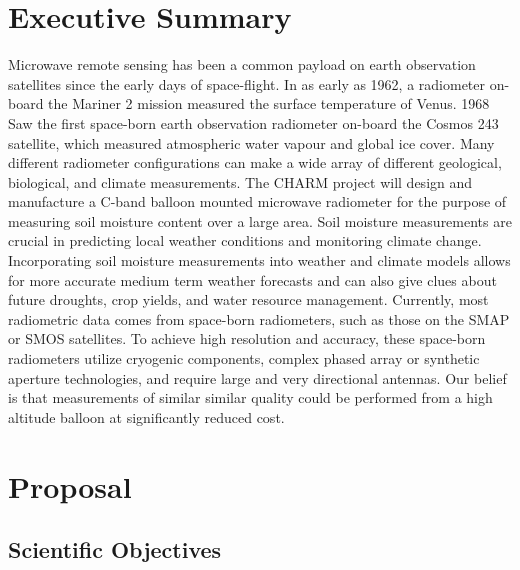 \documentclass[12pt]{article}
\begin{document}
\listoftables
\newpage

\sectionfont{\scshape}


\section{Executive Summary}
Microwave remote sensing has been a common payload on earth observation satellites since the early days of space-flight. In as early as 1962, a radiometer on-board the Mariner 2 mission measured the surface temperature of Venus. 1968 Saw the first space-born earth observation radiometer on-board the  Cosmos 243 satellite, which measured atmospheric water vapour and global ice cover. Many different radiometer configurations can make a wide array of different geological, biological, and climate measurements. The CHARM project will design and manufacture a C-band balloon mounted microwave radiometer for the purpose of measuring soil moisture content over a large area. Soil moisture measurements are crucial in predicting local weather conditions and monitoring climate change. Incorporating soil moisture measurements into weather and climate models allows for more accurate medium term weather forecasts and can also give clues about future droughts, crop yields, and water resource management. Currently, most radiometric data comes from space-born radiometers, such as those on the SMAP or SMOS satellites. To achieve high resolution and accuracy, these space-born radiometers utilize cryogenic components, complex phased array or synthetic aperture technologies, and require large and very directional antennas. Our belief is that measurements of similar similar quality could be performed from a high altitude balloon at significantly reduced cost. 

\newpage

\section{Proposal}
\subsection{Scientific Objectives}
\end{document}
